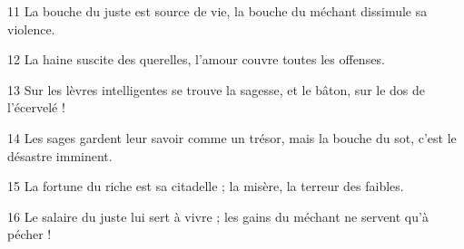
11 La bouche du juste est source de vie, la bouche du méchant dissimule sa violence.

12 La haine suscite des querelles, l’amour couvre toutes les offenses.

13 Sur les lèvres intelligentes se trouve la sagesse, et le bâton, sur le dos de l’écervelé !

14 Les sages gardent leur savoir comme un trésor, mais la bouche du sot, c’est le désastre imminent.

15 La fortune du riche est sa citadelle ; la misère, la terreur des faibles.

16 Le salaire du juste lui sert à vivre ; les gains du méchant ne servent qu’à pécher !